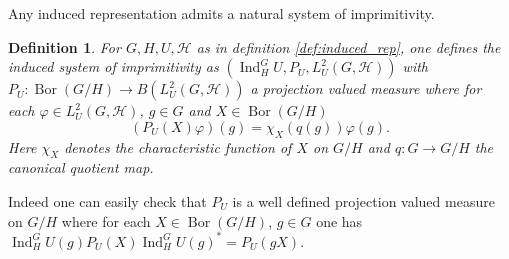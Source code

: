 \documentclass[sn-mathphys-num]{sn-jnl}%
\newcommand{\HH}{\mathcal{H}}
\DeclareMathOperator{\Bor}{Bor}
\DeclareMathOperator{\Ind}{Ind}
\numberwithin{equation}{section}
\theoremstyle{thmstyleone}%
\theoremstyle{thmstyletwo}%
\theoremstyle{thmstylethree}%
\newtheorem{definition}[theorem]{Definition}%
\begin{document}
    Any induced representation admits a natural system of imprimitivity.
    \begin{definition}
        \label{def:induced_si}
        For $G,H,U,\HH$ as in definition \ref{def:induced_rep}, one defines the \textup{induced system of imprimitivity} as $(\Ind_H^G U,P_U,L^2_U(G,\HH))$ with $P_U:\Bor(G/H)\to B(L^2_U(G,\HH))$ a projection valued measure where for each $\varphi\in L^2_U(G,\HH)$, $g\in G$ and $X\in\Bor(G/H)$
        \begin{equation}
            (P_U(X)\varphi)(g)=\chi_X(q(g))\varphi(g).
        \end{equation}
        Here $\chi_X$ denotes the characteristic function of $X$ on $G/H$ and $q:G\to G/H$ the canonical quotient map.
    \end{definition}
    Indeed one can easily check that $P_U$ is a well defined projection valued measure on $G/H$ where for each $X\in \Bor(G/H)$, $g\in G$ one has $\Ind_H^G U(g)P_U(X)\Ind_H^G U(g)^*=P_U(gX)$.
    
\end{document}
